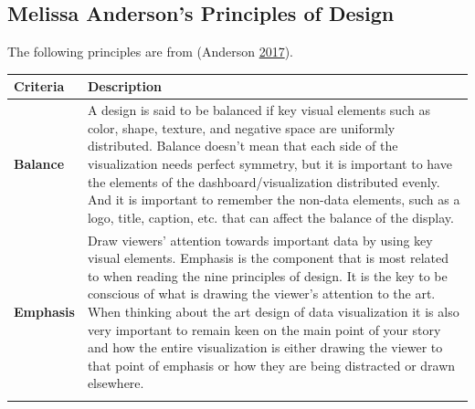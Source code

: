 \documentclass[]{book}
\begin{document}
\hypertarget{melissa-andersons-principles-of-design}{%
\subsection{Melissa Anderson's Principles of Design}\label{melissa-andersons-principles-of-design}}

The following principles are from (Anderson \protect\hyperlink{ref-design_principles}{2017}).

\begin{longtable}[]{@{}ll@{}}
\toprule
\begin{minipage}[b]{0.15\columnwidth}\raggedright
\textbf{Criteria}\strut
\end{minipage} & \begin{minipage}[b]{0.79\columnwidth}\raggedright
\textbf{Description}\strut
\end{minipage}\tabularnewline
\midrule
\endhead
\begin{minipage}[t]{0.15\columnwidth}\raggedright
\textbf{Balance}\strut
\end{minipage} & \begin{minipage}[t]{0.79\columnwidth}\raggedright
A design is said to be balanced if key visual elements such as color, shape, texture, and negative space are uniformly distributed. Balance doesn't mean that each side of the visualization needs perfect symmetry, but it is important to have the elements of the dashboard/visualization distributed evenly. And it is important to remember the non-data elements, such as a logo, title, caption, etc. that can affect the balance of the display.\strut
\end{minipage}\tabularnewline
\begin{minipage}[t]{0.15\columnwidth}\raggedright
\textbf{Emphasis}\strut
\end{minipage} & \begin{minipage}[t]{0.79\columnwidth}\raggedright
Draw viewers' attention towards important data by using key visual elements. Emphasis is the component that is most related to when reading the nine principles of design. It is the key to be conscious of what is drawing the viewer's attention to the art. When thinking about the art design of data visualization it is also very important to remain keen on the main point of your story and how the entire visualization is either drawing the viewer to that point of emphasis or how they are being distracted or drawn elsewhere.\strut
\end{minipage}\tabularnewline
\begin{minipage}[t]{0.15\columnwidth}\raggedright

\end{minipage}
\end{longtable}
\end{document}
